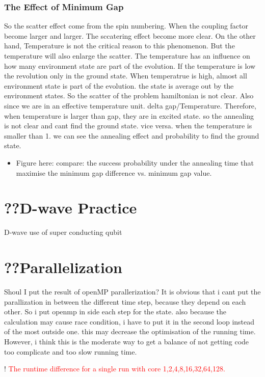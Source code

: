 \documentclass[twoside,a4paper,article]{combine}
\begin{document}
\subsubsection{The Effect of Minimum Gap}
	So the scatter effect come from the spin numbering. When the coupling factor become larger and larger. The sccatering effect become more clear. On the other hand, Temperature is not the critical reason to this phenomenon. But the temperature will also enlarge the scatter. The temperature has an influence on how many environment state are part of the evolution. If the temperature is low the revolution only in the ground state. When temperatrue is high, almost all environment state is part of the evolution. the state is average out by the environment states. So the scatter of the problem hamiltonian is not clear. Also since we are in an effective temperature unit. delta gap/Temperature. Therefore, when temperature is larger than gap, they are in excited state. so the annealing is not clear and cant find the ground state. vice versa. when the temperature is smaller than 1. we can see the annealing effect and probability to find the ground state. 
	\begin{itemize}
		\item \checkmark Figure here: compare: the success probability under the annealing time that maximise the minimum gap difference vs. minimum gap value.
	\end{itemize}
\section{??D-wave Practice}
	\cite{Johnson2011}
	D-wave use of super conducting qubit
	
\section{??Parallelization}
	\textcolor{light-gray}{Shoul I put the result of openMP parallerization?}
	It is obvious that i cant put the parallization in between the different time step, because they depend on each other. So i put openmp in side each step for the state. also because the calculation may cause race condition, i have to put it in the second loop instead of the most outside one. this may decrease the optimisation of the running time. However, i think this is the moderate way to get a balance of not getting code too complicate and too slow running time.
	
	! \textcolor{red}{The runtime difference for a single run with core 1,2,4,8,16,32,64,128.}
\end{document}
